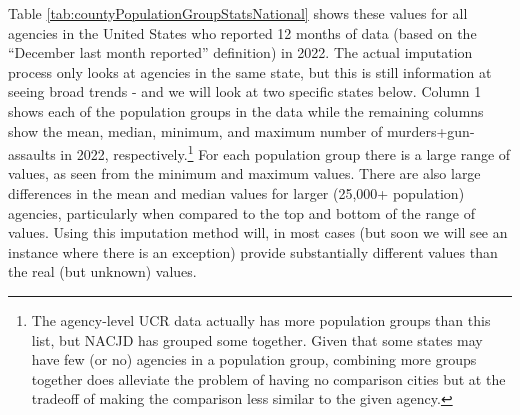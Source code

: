 \documentclass[
]{krantz}
\begin{document}
Table \ref{tab:countyPopulationGroupStatsNational} shows
these values for all agencies in the United States who
reported 12 months of data (based on the ``December last
month reported'' definition) in 2022. The actual imputation
process only looks at agencies in the same state, but this
is still information at seeing broad trends - and we will
look at two specific states below. Column 1 shows each of
the population groups in the data while the remaining
columns show the mean, median, minimum, and maximum number
of murders+gun-assaults in 2022, respectively.\footnote{The
  agency-level UCR data actually has more population groups
  than this list, but NACJD has grouped some together. Given
  that some states may have few (or no) agencies in a
  population group, combining more groups together does
  alleviate the problem of having no comparison cities but
  at the tradeoff of making the comparison less similar to
  the given agency.} For each population group there is a
large range of values, as seen from the minimum and maximum
values. There are also large differences in the mean and
median values for larger (25,000+ population) agencies,
particularly when compared to the top and bottom of the
range of values. Using this imputation method will, in most
cases (but soon we will see an instance where there is an
exception) provide substantially different values than the
real (but unknown) values.
\end{document}

